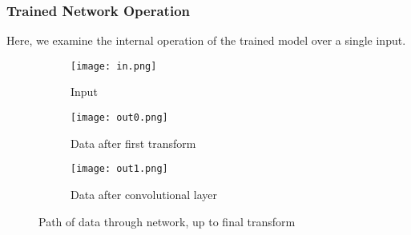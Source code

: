 \subsubsection{Trained Network Operation}
Here, we examine the internal operation of the trained model over a single 
input.
\begin{figure}[h]
	\centering
	\begin{subfigure}{.15\textwidth}
		\centering
		\texttt{[image: in.png]}
		\caption{Input}
	\end{subfigure}
	\hspace{1em}
	\begin{subfigure}{.3\textwidth}
		\texttt{[image: out0.png]}
		\caption{Data after first transform}
	\end{subfigure}
	\hspace{1em}
	\begin{subfigure}{.3\textwidth}
		\texttt{[image: out1.png]}
		\caption{Data after convolutional layer}
	\end{subfigure}
	\caption{Path of data through network, up to final transform}
	\label{fig:3neur_input}
\end{figure}

